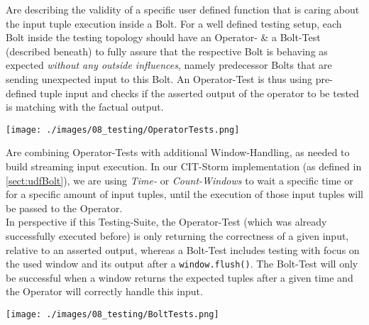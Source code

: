 	\begin{description}
		Are describing the validity of a specific user defined function that is caring about the input tuple execution inside a Bolt. For a well defined testing setup, each Bolt inside the testing topology should have an Operator- \& a Bolt-Test (described beneath) to fully assure that the respective Bolt is behaving as expected \textit{without any outside influences}, namely predecessor Bolts that are sending unexpected input to this Bolt. An Operator-Test is thus using pre-defined tuple input and checks if the asserted output of the operator to be tested is matching with the factual output.
		\begin{center}
			\texttt{[image: ./images/08\_testing/OperatorTests.png]}
		\end{center}

		
		Are combining Operator-Tests with additional Window-Handling, as needed to build streaming input execution. In our CIT-Storm implementation (as defined in \ref{sect:udfBolt}), we are using \textit{Time-} or \textit{Count-Windows} to wait a specific time or for a specific amount of input tuples, until the execution of those input tuples will be passed to the Operator. \\
		In perspective if this Testing-Suite, the Operator-Test (which was already successfully executed before) is only returning the correctness of a given input, relative to an asserted output, whereas a Bolt-Test includes testing with focus on the used window and its output after a \texttt{window.flush()}. The Bolt-Test will only be successful when a window returns the expected tuples after a given time and the Operator will correctly handle this input.
		\begin{center}
			\texttt{[image: ./images/08\_testing/BoltTests.png]}
		\end{center}
	 

\end{description}
